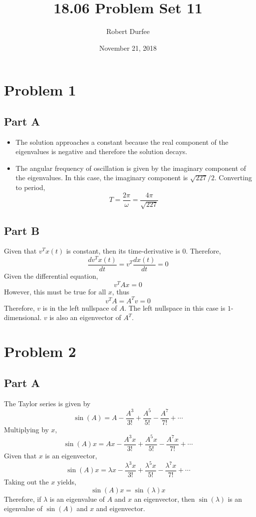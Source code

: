 \documentclass{article}
\title{18.06 Problem Set 11}
\author{Robert Durfee}
\date{November 21, 2018}
\begin{document}
\maketitle

\section*{Problem 1}

\subsection*{Part A}

\begin{itemize}
  \item The solution approaches a constant because the real component of the
  eigenvalues is negative and therefore the solution decays.
  \item The angular frequency of oscillation is given by the imaginary
  component of the eigenvalues. In this case, the imaginary component is
  $\sqrt{227} / 2$. Converting to period,
  $$ T = \frac{2 \pi}{\omega} = \frac{4 \pi}{\sqrt{227}} $$
\end{itemize}

\subsection*{Part B}

Given that $v^T x(t)$ is constant, then its time-derivative is $0$. Therefore,
$$ \frac{d v^T x(t)}{dt} = v^T \frac{dx(t)}{dt} = 0 $$
Given the differential equation,
$$ v^T A x = 0 $$
However, this must be true for all $x$, thus
$$ v^T A = A^T v = 0 $$
Therefore, $v$ is in the left nullspace of $A$. The left nullspace in this
case is $1$-dimensional. $v$ is also an eigenvector of $A^T$.

\section*{Problem 2}

\subsection*{Part A}

The Taylor series is given by
$$ \sin(A) = A - \frac{A^3}{3!} + \frac{A^5}{5!} - \frac{A^7}{7!} + \cdots $$
Multiplying by $x$,
$$ \sin(A) x = Ax - \frac{A^3 x}{3!} + \frac{A^5 x}{5!} - \frac{A^7 x}{7!} +
\cdots $$
Given that $x$ is an eigenvector,
$$ \sin(A) x = \lambda x - \frac{\lambda^3 x}{3!} + \frac{\lambda^5 x}{5!} -
\frac{\lambda^7 x}{7!} + \cdots $$
Taking out the $x$ yields,
$$ \sin(A) x = \sin(\lambda) x $$
Therefore, if $\lambda$ is an eigenvalue of $A$ and $x$ an eigenvector, then
$\sin(\lambda)$ is an eigenvalue of $\sin(A)$ and $x$ and eigenvector.
\end{document}
